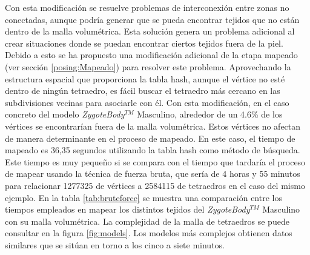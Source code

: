 Con esta modificación se resuelve problemas de interconexión entre zonas no conectadas, aunque podría generar que se pueda encontrar tejidos que no están dentro de la malla volumétrica. Esta solución genera un problema  adicional al crear situaciones donde se puedan encontrar ciertos tejidos fuera de la piel. Debido a esto se ha propuesto una modificación adicional de la etapa mapeado (ver sección \ref{posing:Mapeado}) para resolver este problema. Aprovechando la estructura espacial que proporciona la \ac{tabla hash}, aunque el vértice no esté dentro de ningún tetraedro, es fácil buscar el tetraedro más cercano en las subdivisiones vecinas para asociarle con él. 
Con esta modificación, en el caso concreto del modelo \emph{ZygoteBody}$^{TM}$ Masculino, alrededor de un 4.6\% de los vértices se encontrarían fuera de la malla volumétrica. 
Estos vértices no afectan de manera determinante en el proceso de mapeado. En este caso, el tiempo de mapeado es 36,35 segundos utilizando la \ac{tabla hash} como método de búsqueda. Este tiempo es muy pequeño si se compara con el tiempo que tardaría el proceso de mapear usando la técnica de fuerza bruta, que sería de 4 horas y 55 minutos para relacionar 1277325 de vértices a 2584115 de tetraedros en el caso del mismo ejemplo.  En la tabla \ref{tab:bruteforce} se muestra una comparación entre los tiempos empleados en mapear los distintos tejidos del \emph{ZygoteBody}$^{TM}$ Masculino con su malla volumétrica. La complejidad de la malla de tetraedros se puede consultar en la figura \ref{fig:models}. Los modelos más complejos obtienen datos similares que se sitúan en torno a los cinco a siete minutos.


       
        
